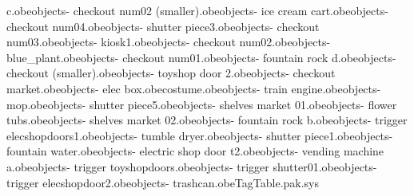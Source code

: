 c.obe objects\bank - checkout num02 (smaller).obe objects\bank - ice cream cart.obe objects\bank - checkout num04.obe objects\bank - shutter piece3.obe objects\bank - checkout num03.obe objects\bank - kiosk1.obe objects\bank - checkout num02.obe objects\bank - blue_plant.obe objects\bank - checkout num01.obe objects\bank - fountain rock d.obe objects\bank - checkout (smaller).obe objects\bank - toyshop door 2.obe objects\bank - checkout market.obe objects\bank - elec box.obe costume\dex.obe objects\bank - train engine.obe objects\bank - mop.obe objects\bank - shutter piece5.obe objects\bank - shelves market 01.obe objects\bank - flower tubs.obe objects\bank - shelves market 02.obe objects\bank - fountain rock b.obe objects\bank - trigger elecshopdoors1.obe objects\bank - tumble dryer.obe objects\bank - shutter piece1.obe objects\bank - fountain water.obe objects\bank - electric shop door t2.obe objects\bank - vending machine a.obe objects\bank - trigger toyshopdoors.obe objects\bank - trigger shutter01.obe objects\bank - trigger elecshopdoor2.obe objects\bank - trashcan.obe TagTable.pak.sys 